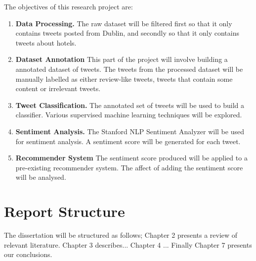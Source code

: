 The objectives of this research project are:
\begin{enumerate}
    \item \textbf{Data Processing.}\newline
    The raw dataset will be filtered first so that it only contains tweets posted from Dublin, and secondly so that it only contains tweets about hotels.
    \item \textbf{Dataset Annotation} \newline
    This part of the project will involve building a annotated dataset of tweets. The tweets from the processed dataset will be manually labelled as either review-like tweets, tweets that contain some content or irrelevant tweets.
    \item \textbf{Tweet Classification.}\newline
    The annotated set of tweets will be used to build a classifier. Various supervised machine learning techniques will be explored.
    \item \textbf{Sentiment Analysis.}\newline
    The Stanford NLP Sentiment Analyzer \cite{stanfordSentiment2013} will be used for sentiment analysis. A sentiment score will be generated for each tweet.
    \item \textbf{Recommender System}\newline
    The sentiment score produced will be applied to a pre-existing recommender system. The affect of adding the sentiment score will be analysed.
\end{enumerate}

\section{Report Structure}
The dissertation will be structured as follows; Chapter 2 presents a review of relevant literature. Chapter 3 describes... Chapter 4 ... Finally Chapter 7 presents our conclusions.